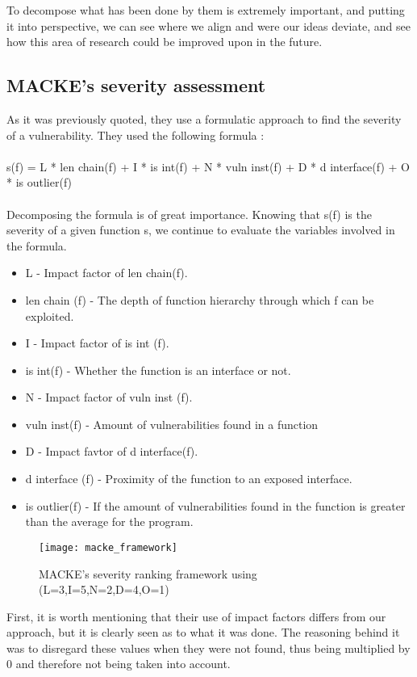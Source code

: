 To decompose what has been done by them is extremely important, and putting it into perspective, we can see where we align and were our ideas deviate, and see how this area of research could be improved upon in the future.

\subsection{MACKE's severity assessment}

As it was previously quoted, they use a formulatic approach to find the severity of a vulnerability. They used the following formula : 
\\\\
s(f) = L * len chain(f) + I * is int(f) + N * vuln inst(f)
+ D * d interface(f) + O * is outlier(f)
\\\\
Decomposing the formula is of great importance. Knowing that s(f) is the severity of a given function s, we continue to evaluate the variables involved in the formula.

\begin{itemize}
	\item L - Impact factor of len chain(f).
	\item len chain (f) - The depth of function hierarchy through which f can be exploited.
	\item I - Impact factor of is int (f).
	\item is int(f) - Whether the function is an interface or not.
	\item N - Impact factor of vuln inst (f).
	\item vuln inst(f) - Amount of vulnerabilities found in a function
	\item D - Impact favtor of d interface(f).
	\item d interface (f) -  Proximity of the function to an exposed interface.
	\item is outlier(f) - If the amount of vulnerabilities found in the function is greater than the average for the program.
\end{itemize}

\begin{figure}[!htb]
	\caption{MACKE's severity ranking framework using (L=3,I=5,N=2,D=4,O=1)}
	\centering
	\texttt{[image: macke\_framework]}
\end{figure}

First, it is worth mentioning that their use of impact factors differs from our approach, but it is clearly seen as to what it was done. The reasoning behind it was to disregard these values when they were not found, thus being multiplied by 0 and therefore not being taken into account.


